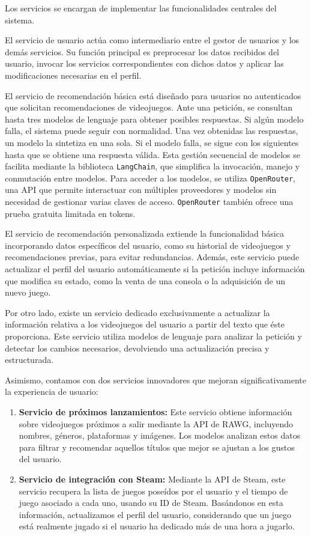 Los servicios se encargan de implementar las funcionalidades centrales del sistema.

El servicio de usuario actúa como intermediario entre el gestor de usuarios y los demás servicios. Su función principal es preprocesar los datos recibidos del usuario, invocar los servicios correspondientes con dichos datos y aplicar las modificaciones necesarias en el perfil.

El servicio de recomendación básica está diseñado para usuarios no autenticados que solicitan recomendaciones de videojuegos. Ante una petición, se consultan hasta tres modelos de lenguaje para obtener posibles respuestas. Si algún modelo falla, el sistema puede seguir con normalidad. Una vez obtenidas las respuestas, un modelo la sintetiza en una sola. Si el modelo falla, se sigue con los siguientes hasta que se obtiene una respuesta válida. Esta gestión secuencial de modelos se facilita mediante la biblioteca \texttt{LangChain}, que simplifica la invocación, manejo y conmutación entre modelos. Para acceder a los modelos, se utiliza \texttt{OpenRouter}, una API que permite interactuar con múltiples proveedores y modelos sin necesidad de gestionar varias claves de acceso. \texttt{OpenRouter} también ofrece una prueba gratuita limitada en tokens.

El servicio de recomendación personalizada extiende la funcionalidad básica incorporando datos específicos del usuario, como su historial de videojuegos y recomendaciones previas, para evitar redundancias. Además, este servicio puede actualizar el perfil del usuario automáticamente si la petición incluye información que modifica su estado, como la venta de una consola o la adquisición de un nuevo juego.

Por otro lado, existe un servicio dedicado exclusivamente a actualizar la información relativa a los videojuegos del usuario a partir del texto que éste proporciona. Este servicio utiliza modelos de lenguaje para analizar la petición y detectar los cambios necesarios, devolviendo una actualización precisa y estructurada.

Asimismo, contamos con dos servicios innovadores que mejoran significativamente la experiencia de usuario:

\begin{enumerate}
	\item \textbf{Servicio de próximos lanzamientos:} Este servicio obtiene información sobre videojuegos próximos a salir mediante la API de RAWG, incluyendo nombres, géneros, plataformas y imágenes. Los modelos analizan estos datos para filtrar y recomendar aquellos títulos que mejor se ajustan a los gustos del usuario.
	\item \textbf{Servicio de integración con Steam:} Mediante la API de Steam, este servicio recupera la lista de juegos poseídos por el usuario y el tiempo de juego asociado a cada uno, usando su ID de Steam. Basándonos en esta información, actualizamos el perfil del usuario, considerando que un juego está realmente jugado si el usuario ha dedicado más de una hora a jugarlo.
\end{enumerate}

